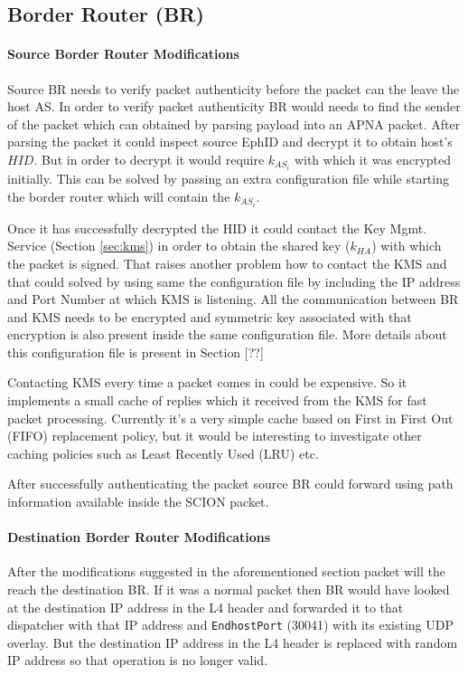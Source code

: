 \subsection{Border Router (BR)}

\paragraph{Source Border Router Modifications} \label{overlay:br_src}
Source BR needs to verify packet authenticity before the packet can the leave the host AS. In order to verify packet authenticity BR would needs to find the sender of the packet which can obtained by parsing payload into an APNA packet. After parsing the packet it could inspect source EphID and decrypt it to obtain host's $HID$. But in order to decrypt it would require $k_{AS_{i}}$ with which it was encrypted initially. This can be solved by passing an extra configuration file while starting the border router which will contain the $k_{AS_{i}}$.

Once it has successfully decrypted the HID it could contact the Key Mgmt. Service (Section \ref{sec:kms}) in order to obtain the shared key ($k_{HA}$) with which the packet is signed. That raises another problem how to contact the KMS and that could solved by using same the configuration file by including the IP address and Port Number at which KMS is listening. All the communication between BR and KMS needs to be encrypted and symmetric key associated with that encryption is also present inside the same configuration file. More details about this configuration file is present in Section [??]

Contacting KMS every time a packet comes in could be expensive. So it implements a small cache of replies which it received from the KMS for fast packet processing. Currently it's a very simple cache based on First in First Out (FIFO) replacement policy, but it would be interesting to investigate other caching policies such as Least Recently Used (LRU) etc.

After successfully authenticating the packet source BR could forward using path information available inside the SCION packet.

\paragraph{Destination Border Router Modifications} \label{overlay:br_dst}
After the modifications suggested in the aforementioned section packet will the reach the destination BR. If it was a normal packet then BR would have looked at the destination IP address in the L4 header and forwarded it to that dispatcher with that IP address and  \texttt{EndhostPort} (30041) with its existing UDP overlay. But the destination IP address in the L4 header is replaced with random IP address so that operation is no longer valid.


